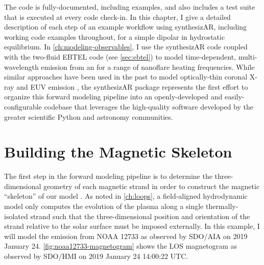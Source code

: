 The code is fully-documented, including examples, and also includes a test suite that is executed at every code check-in. In this chapter, I give a detailed description of each step of an example workflow using synthesizAR, including working code examples throughout, for a simple dipolar \AR{} in hydrostatic equilibrium. In \autoref{ch:modeling-observables}, I use the synthesizAR code coupled with the two-fluid EBTEL code (see \autoref{sec:ebtel}) to model time-dependent, multi-wavelength emission from an \AR{} for a range of nanoflare heating frequencies. While similar approaches have been used in the past to model optically-thin coronal X-ray and EUV emission \citep[e.g.][]{warren_hydrostatic_2006,schrijver_coronal_2004,lundquist_forward_2008,lundquist_forward_2008-1,bradshaw_patterns_2016,allred_3d_2018}, the synthesizAR package represents the first effort to organize this forward modeling pipeline into an openly-developed and easily-configurable codebase that leverages the high-quality software developed by the greater scientific Python and astronomy communities.

\section{Building the Magnetic Skeleton}

The first step in the forward modeling pipeline is to determine the three-dimensional geometry of each magnetic strand in order to construct the magnetic ``skeleton'' of our model \AR{}. As noted in \autoref{ch:loops}, a field-aligned hydrodynamic model only computes the evolution of the plasma along a single thermally-isolated strand such that the three-dimensional position and orientation of the strand relative to the solar surface must be imposed externally. In this example, I will model the emission from \AR{} NOAA 12733 as observed by SDO/AIA on 2019 January 24. \autoref{fig:noaa12733-magnetogram} shows the LOS magnetogram as observed by SDO/HMI on 2019 January 24 14:00:22 UTC.

